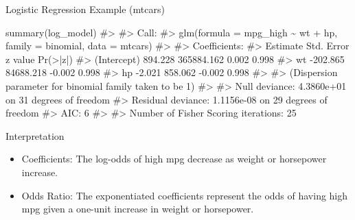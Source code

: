 \documentclass[
  18 pt,
  ignorenonframetext,
  aspectratio=1610,
]{beamer}
\newenvironment{Shaded}{\begin{snugshade}}{\end{snugshade}}
\newcommand{\CommentTok}[1]{\textcolor[rgb]{0.37,0.37,0.37}{#1}}
\newcommand{\FunctionTok}[1]{\textcolor[rgb]{0.28,0.35,0.67}{#1}}
\newcommand{\NormalTok}[1]{\textcolor[rgb]{0.00,0.23,0.31}{#1}}
\providecommand{\tightlist}{%
  \setlength{\itemsep}{0pt}\setlength{\parskip}{0pt}}\usepackage{longtable,booktabs,array}
\begin{document}
\begin{frame}[fragile]{Logistic Regression Example (mtcars)}
\protect\hypertarget{logistic-regression-example-mtcars-1}{}
\tiny

\begin{Shaded}
\begin{Highlighting}[]
\FunctionTok{summary}\NormalTok{(log\_model)}
\CommentTok{\#\textgreater{} }
\CommentTok{\#\textgreater{} Call:}
\CommentTok{\#\textgreater{} glm(formula = mpg\_high \textasciitilde{} wt + hp, family = binomial, data = mtcars)}
\CommentTok{\#\textgreater{} }
\CommentTok{\#\textgreater{} Coefficients:}
\CommentTok{\#\textgreater{}               Estimate Std. Error z value Pr(\textgreater{}|z|)}
\CommentTok{\#\textgreater{} (Intercept)    894.228 365884.162   0.002    0.998}
\CommentTok{\#\textgreater{} wt            {-}202.865  84688.218  {-}0.002    0.998}
\CommentTok{\#\textgreater{} hp              {-}2.021    858.062  {-}0.002    0.998}
\CommentTok{\#\textgreater{} }
\CommentTok{\#\textgreater{} (Dispersion parameter for binomial family taken to be 1)}
\CommentTok{\#\textgreater{} }
\CommentTok{\#\textgreater{}     Null deviance: 4.3860e+01  on 31  degrees of freedom}
\CommentTok{\#\textgreater{} Residual deviance: 1.1156e{-}08  on 29  degrees of freedom}
\CommentTok{\#\textgreater{} AIC: 6}
\CommentTok{\#\textgreater{} }
\CommentTok{\#\textgreater{} Number of Fisher Scoring iterations: 25}
\end{Highlighting}
\end{Shaded}

\begin{block}{Interpretation}
\protect\hypertarget{interpretation-8}{}
\begin{itemize}
\tightlist
\item
  Coefficients: The log-odds of high mpg decrease as weight or
  horsepower increase.
\item
  Odds Ratio: The exponentiated coefficients represent the odds of
  having high mpg given a one-unit increase in weight or horsepower.
\end{itemize}
\end{block}
\end{frame}
\end{document}
